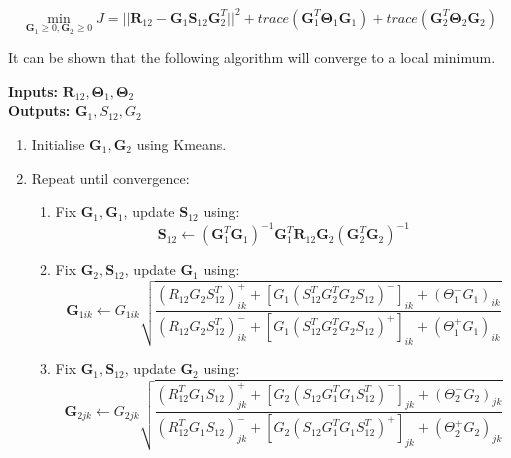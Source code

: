 \documentclass{article}
\begin{document}
			\begin{equation}
				\min_{ \boldsymbol G_1 \ge 0, \boldsymbol G_2 \ge 0 } J = { || \boldsymbol R_{12} - \boldsymbol G_1 \boldsymbol S_{12} \boldsymbol G_2^T ||^2 } + trace( \boldsymbol G_1^T \boldsymbol \Theta_1 \boldsymbol G_1 ) + trace( \boldsymbol G_2^T \boldsymbol \Theta_2 \boldsymbol G_2 )
			\end{equation}
			
			\noindent It can be shown that the following algorithm will converge to a local minimum.
			
			\begin{framed}
				\noindent \textbf{Inputs: } \( \boldsymbol R_{12}, \boldsymbol \Theta_1, \boldsymbol \Theta_2 \) \\
				\textbf{Outputs: } \( \boldsymbol G_1, S_{12}, G_2 \)
				
				\begin{enumerate}
					\itemsep0em
					\item Initialise \( \boldsymbol G_1, \boldsymbol G_2 \) using Kmeans.
					\item Repeat until convergence:
					\begin{enumerate}
						\itemsep0em
						\item Fix \( \boldsymbol G_1, \boldsymbol G_1 \), update \( \boldsymbol S_{12} \) using:
							\begin{equation*}
								\boldsymbol S_{12} \leftarrow ( \boldsymbol G_1^T \boldsymbol G_1 )^{-1} \boldsymbol G_1^T \boldsymbol R_{12} \boldsymbol G_2 ( \boldsymbol G_2^T \boldsymbol G_2 )^{-1}
							\end{equation*}
						\item Fix \( \boldsymbol G_2, \boldsymbol S_{12} \), update \( \boldsymbol G_1 \) using:
							\begin{equation*}
								\boldsymbol G_{1ik} \leftarrow G_{1ik} \sqrt
									{ \frac{ (R_{12} G_2 S_{12}^T)_{ik}^+ +  [G_1 (S_{12}^T G_2^T G_2 S_{12})^-]_{ik} + (\Theta_1^- G_1)_{ik} }
									{ (R_{12} G_2 S_{12}^T)_{ik}^- +  [G_1 (S_{12}^T G_2^T G_2 S_{12})^+]_{ik} + (\Theta_1^+ G_1)_{ik} } }
							\end{equation*}
							
						\item Fix \( \boldsymbol G_1, \boldsymbol S_{12} \), update \( \boldsymbol G_2 \) using:
							\begin{equation*}
								\boldsymbol G_{2jk} \leftarrow G_{2jk} \sqrt
									{ \frac{ (R_{12}^T G_1 S_{12})_{jk}^+ +  [G_2 (S_{12} G_1^T G_1 S_{12}^T)^-]_{jk} + (\Theta_2^- G_2)_{jk} }
									{ (R_{12}^T G_1 S_{12})_{jk}^- +  [G_2 (S_{12} G_1^T G_1 S_{12}^T)^+]_{jk} + (\Theta_2^+ G_2)_{jk} } }
							\end{equation*}
					\end{enumerate}
				\end{enumerate}
			\end{framed}
			
\end{document}
